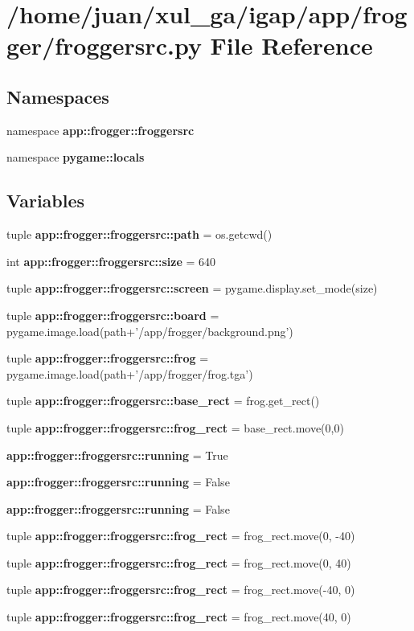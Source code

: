\section{/home/juan/xul\_\-ga/igap/app/frogger/froggersrc.py File Reference}
\label{froggersrc_8py}
\subsection*{Namespaces}
\begin{CompactItemize}
\item 
namespace {\bf app::frogger::froggersrc}
\item 
namespace {\bf pygame::locals}
\end{CompactItemize}
\subsection*{Variables}
\begin{CompactItemize}
\item 
tuple {\bf app::frogger::froggersrc::path} = os.getcwd()
\item 
int {\bf app::frogger::froggersrc::size} = 640
\item 
tuple {\bf app::frogger::froggersrc::screen} = pygame.display.set\_\-mode(size)
\item 
tuple {\bf app::frogger::froggersrc::board} = pygame.image.load(path+'/app/frogger/background.png')
\item 
tuple {\bf app::frogger::froggersrc::frog} = pygame.image.load(path+'/app/frogger/frog.tga')
\item 
tuple {\bf app::frogger::froggersrc::base\_\-rect} = frog.get\_\-rect()
\item 
tuple {\bf app::frogger::froggersrc::frog\_\-rect} = base\_\-rect.move(0,0)
\item 
{\bf app::frogger::froggersrc::running} = True
\item 
{\bf app::frogger::froggersrc::running} = False
\item 
{\bf app::frogger::froggersrc::running} = False
\item 
tuple {\bf app::frogger::froggersrc::frog\_\-rect} = frog\_\-rect.move(0, -40)
\item 
tuple {\bf app::frogger::froggersrc::frog\_\-rect} = frog\_\-rect.move(0, 40)
\item 
tuple {\bf app::frogger::froggersrc::frog\_\-rect} = frog\_\-rect.move(-40, 0)
\item 
tuple {\bf app::frogger::froggersrc::frog\_\-rect} = frog\_\-rect.move(40, 0)
\end{CompactItemize}

